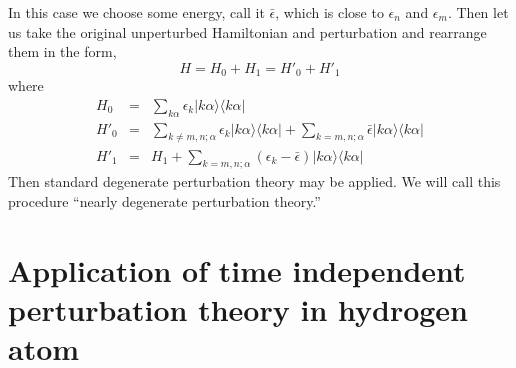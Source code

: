 \documentclass[cyan]{elegantnote}
\begin{document}
In this case we choose some energy, call it $\bar{\epsilon}$, which is close to $\epsilon_n$ and $\epsilon_m$. Then let us take the original unperturbed Hamiltonian and perturbation and rearrange them in the form,
\[H = H_0 + H_1 = H'_0 + H'_1\]
where
\begin{eqnarray}
H_0 &=& \sum_{k\alpha} \epsilon_k |k\alpha\rangle\langle k\alpha| \nonumber \\
H'_0 &=& \sum_{k\neq m,n; \alpha} \epsilon_k |k\alpha\rangle\langle k\alpha| + \sum_{k= m,n; \alpha} \bar{\epsilon} |k\alpha\rangle\langle k\alpha| \nonumber \\
H'_1 &=& H_1 + \sum_{k= m,n; \alpha} (\epsilon_k - \bar{\epsilon} )|k\alpha\rangle\langle k\alpha| \nonumber
\end{eqnarray}
Then standard degenerate perturbation theory may be applied.
We will call this procedure ``nearly degenerate perturbation theory.''

\section{Application of time independent perturbation theory in hydrogen atom}
\end{document}
